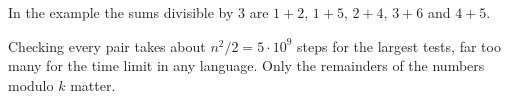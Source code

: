 In the example the sums divisible by $3$ are $1 + 2$, $1 + 5$, $2 + 4$, $3 + 6$ and $4 + 5$.

Checking every pair takes about $n^2 / 2 = 5 \cdot 10^9$ steps for the largest tests, far too many for the time limit in any language. Only the remainders of the numbers modulo $k$ matter.
